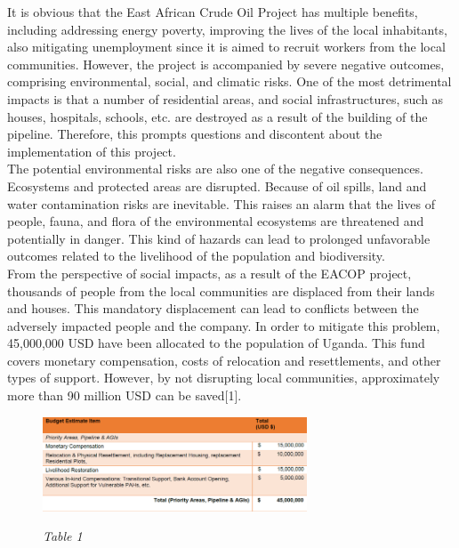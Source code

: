 \documentclass[12pt]{article}
\begin{document}
{\fontsize{12pt}{12pt}\selectfont  

\hspace*{1em}It is obvious that the East African Crude Oil Project has multiple benefits, including addressing energy poverty, improving the lives of the local inhabitants, also mitigating unemployment since it is aimed to recruit workers from the local communities. However, the project is accompanied by severe negative outcomes, comprising environmental, social, and climatic risks. One of the most detrimental impacts is that a number of residential areas, and social infrastructures, such as houses, hospitals, schools, etc. are destroyed as a result of the building of the pipeline. Therefore, this prompts questions and discontent about the implementation of this project.
\\

The potential environmental risks are also one of the negative consequences. Ecosystems and protected areas are disrupted. Because of oil spills, land and water contamination risks are inevitable. This raises an alarm that the lives of people, fauna, and flora of the environmental ecosystems are threatened and potentially in danger. This kind of hazards can lead to prolonged unfavorable outcomes related to the livelihood of the population and biodiversity.
\\

From the perspective of social impacts, as a result of the EACOP project, thousands of people from the local communities are displaced from their lands and houses. This mandatory displacement can lead to conflicts between the adversely impacted people and the company.  In order to mitigate this problem, 45,000,000 USD have been allocated to the population of Uganda. This fund covers monetary compensation, costs of relocation and resettlements, and other types of support. However, by not disrupting local communities, approximately more than 90 million USD can be saved[1].
\\


}


\begin{figure}[h!]
\begin{center}

	\centering
	\includegraphics[width=0.7\textwidth]{assets/images/table.png}
	
	\textit{Table 1}
\end{center}
	
\end{figure}
\end{document}
